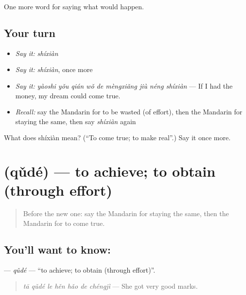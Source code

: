 \begin{grammarlens}[title={What you've built}]
One more word for saying what would happen.
\end{grammarlens}

\subsection*{Your turn}
\begin{itemize}
\raggedright
  \item \emph{Say it:} \emph{shíxiàn}
  \item \emph{Say it:} \emph{shíxiàn}, once more
  \item \emph{Say it:} \emph{yàoshi yǒu qián wǒ de mèngxiǎng jiù néng shíxiàn} — If I had the money, my dream could come true.
  \item \emph{Recall:} say the Mandarin for to be wasted (of effort), then the Mandarin for staying the same, then say \emph{shíxiàn} again
\end{itemize}

\begin{tcolorbox}[breakable,colback=teal!4,colframe=teal!35!black,title={Before you move on}]
What does shíxiàn mean? (\textquotedblleft{}To come true; to make real\textquotedblright{}.) Say it once more.
\end{tcolorbox}
\section[\texorpdfstring{\zh{取得} (qǔdé)}{取得 (qǔdé)}]{ (qǔdé) — to achieve; to obtain (through effort)}

\label{lesson:ZH-C395-qude}



\begin{quote}
Before the new one: say the Mandarin for staying the same, then the Mandarin for to come true.
\end{quote}

\subsection*{You'll want to know: }
\textbf{} — \emph{qǔdé} — \textquotedblleft{}to achieve; to obtain (through effort)\textquotedblright{}.

\begin{quote}
\emph{tā qǔdé le hěn hǎo de chéngjì} — She got very good marks.
\end{quote}

